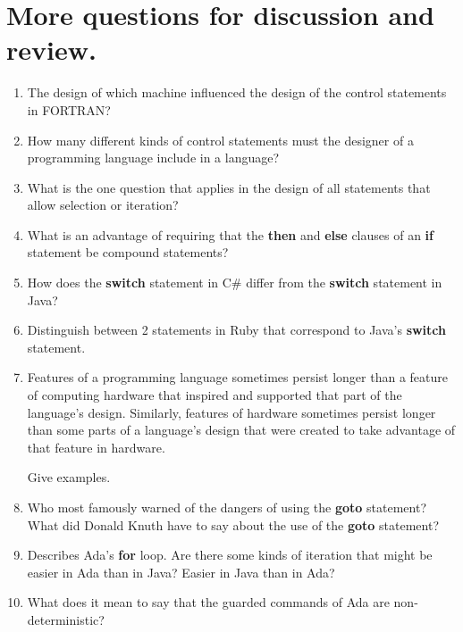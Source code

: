 \section{More questions for discussion and review.}

\begin{enumerate}
  \item The design of which machine influenced the design
    of the control statements in FORTRAN?

  \item How many different kinds of control statements
    must the designer of a programming language include
    in a language?

  \item What is the one question that applies in the
    design of all statements that allow selection or
    iteration?

  \item What is an advantage of requiring that
    the \textbf{then} and \textbf{else} clauses of
    an \textbf{if} statement be compound statements?

  \item How does the \textbf{switch} statement in C\#
    differ from the \textbf{switch} statement in Java?

  \item Distinguish between 2 statements in Ruby
    that correspond to Java's \textbf{switch} statement.

  \item Features of a programming language sometimes persist
    longer than a feature of computing hardware that inspired
    and supported that part of the language's design.
    Similarly, features of hardware sometimes persist longer
    than some parts of a language's design that were created
    to take advantage of that feature in hardware.

    Give examples.

  \item Who most famously warned of the dangers of using the
    \textbf{goto} statement? What did Donald Knuth have to
    say about the use of the \textbf{goto} statement?

  \item Describes Ada's \textbf{for} loop. Are there some
    kinds of iteration that might be easier in Ada than
    in Java? Easier in Java than in Ada?

  \item What does it mean to say that the guarded commands
    of Ada are non-deterministic?


\end{enumerate}
